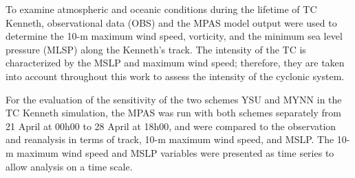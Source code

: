 \documentclass[8pt,a4paper]{article}
\begin{document}
	To examine atmospheric and oceanic conditions during the lifetime of TC Kenneth, observational data (OBS) and the MPAS model output were used to determine the 10-m maximum wind speed, vorticity, and the minimum sea level pressure (MLSP) along the Kenneth's track. The intensity of the TC is characterized by the MSLP and maximum wind speed; therefore, they are taken into account throughout this work to assess the intensity of the cyclonic system.
	
	For the evaluation of the sensitivity of the two schemes YSU and MYNN in the TC Kenneth simulation, the MPAS was run with both schemes separately from 21 April at 00h00 to 28 April at 18h00, and were compared to the observation and reanalysis in terms of track, 10-m maximum wind speed, and MSLP. The 10-m maximum wind speed and MSLP variables were presented as time series to allow analysis on a time scale.
	
	
	
\end{document}
